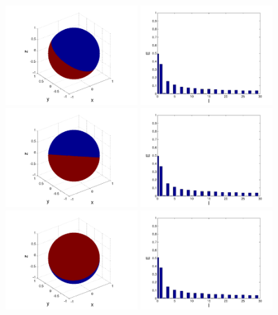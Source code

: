 \begin{refsection}
\begin{figure}
\includegraphics[width=0.45\textwidth]{kugel/kSpektrum/Kugel_2_1.pdf}
\includegraphics[width=0.45\textwidth]{kugel/kSpektrum/Kugel_2_2.pdf}
\includegraphics[width=0.45\textwidth]{kugel/kSpektrum/Kugel_3_1.pdf}
\includegraphics[width=0.45\textwidth]{kugel/kSpektrum/Kugel_3_2.pdf}
\includegraphics[width=0.45\textwidth]{kugel/kSpektrum/Kugel_4_1.pdf}
\includegraphics[width=0.45\textwidth]{kugel/kSpektrum/Kugel_4_2.pdf}
\label{skript:Spektrum1}%
\end{figure}


\end{refsection}
